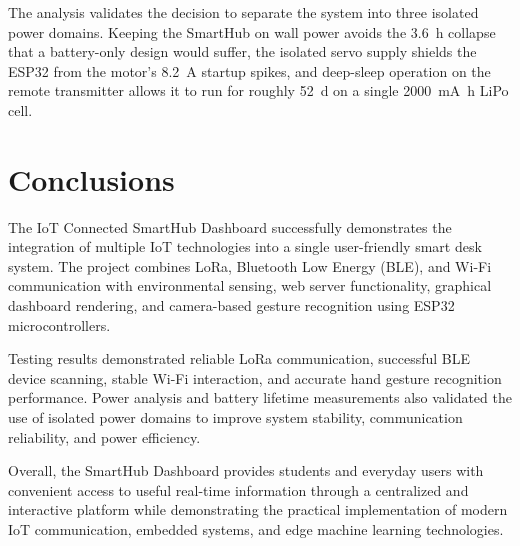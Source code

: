 \documentclass[11pt,letterpaper]{article}
\begin{document}
The analysis validates the decision to separate the system into three
isolated power domains. Keeping the SmartHub on wall power avoids the
\SI{3.6}{\hour} collapse that a battery-only design would suffer, the
isolated servo supply shields the ESP32 from the motor's
\SI{8.2}{\ampere} startup spikes, and deep-sleep operation on the
remote transmitter allows it to run for roughly \SI{52}{\day} on a
single \SI{2000}{\milli\ampere\hour} LiPo cell.

\section{Conclusions}
The IoT Connected SmartHub Dashboard successfully demonstrates the
integration of multiple IoT technologies into a single user-friendly
smart desk system. The project combines LoRa, Bluetooth Low Energy
(BLE), and Wi-Fi communication with environmental sensing, web server
functionality, graphical dashboard rendering, and camera-based gesture
recognition using ESP32 microcontrollers.

Testing results demonstrated reliable LoRa communication, successful
BLE device scanning, stable Wi-Fi interaction, and accurate hand
gesture recognition performance. Power analysis and battery lifetime
measurements also validated the use of isolated power domains to
improve system stability, communication reliability, and power
efficiency.

Overall, the SmartHub Dashboard provides students and everyday users
with convenient access to useful real-time information through a
centralized and interactive platform while demonstrating the practical
implementation of modern IoT communication, embedded systems, and
edge machine learning technologies.

\end{document}
